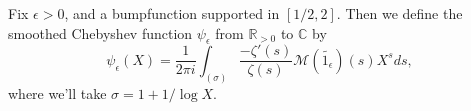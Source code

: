 \begin{definition}[SmoothedChebyshev]
\label{SmoothedChebyshev}
\leanok
Fix $\epsilon>0$, and a bumpfunction supported in $[1/2,2]$. Then we define the smoothed
  Chebyshev function $\psi_{\epsilon}$ from $\mathbb{R}_{>0}$ to $\mathbb{C}$ by
  $$\psi_{\epsilon}(X) = \frac{1}{2\pi i}\int_{(\sigma)}\frac{-\zeta'(s)}{\zeta(s)}
  \mathcal{M}(\widetilde{1_{\epsilon}})(s)
  X^{s}ds,$$
  where we'll take $\sigma = 1 + 1 / \log X$.
\end{definition}
